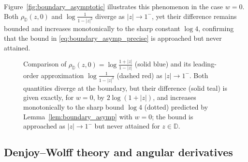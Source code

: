 \documentclass[12pt]{amsart}
\numberwithin{equation}{section}
\theoremstyle{plain}
\theoremstyle{definition}
\begin{document}
Figure~\ref{fig:boundary_asymptotic} illustrates this phenomenon in the case $w=0$. Both
$\rho_{\mathbb D}(z,0)$ and $\log\frac{1}{1-|z|^2}$ diverge as $|z|\to1^-$, yet their difference
remains bounded and increases monotonically to the sharp constant $\log 4$, confirming that the
bound in \eqref{eq:boundary_asymp_precise} is approached but never attained.
\begin{figure}
    \centering

    \caption{Comparison of $\rho_{\mathbb D}(z,0)=\log\frac{1+|z|}{1-|z|}$ (solid blue) and its
leading-order approximation $\log\frac{1}{1-|z|^2}$ (dashed red) as $|z|\to 1^-$. Both quantities
diverge at the boundary, but their difference (solid teal) is given exactly, for $w=0$, by
$2\log(1+|z|)$, and increases monotonically to the sharp bound $\log 4$ (dotted) predicted by
Lemma~\ref{lem:boundary_asymp} with $w=0$; the bound is approached as $|z|\to 1^-$ but never
attained for $z\in\mathbb D$.}
\label{fig:boundary_asymptotic}
\label{fig:placeholder}
\end{figure}
\subsection{Denjoy--Wolff theory and angular derivatives}
\label{subsec:dw}
\end{document}
